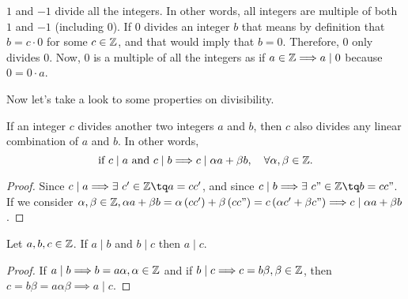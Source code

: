 
\begin{remark}
    $1$ and $-1$ divide all the integers. In other words, all integers are multiple of both $1$ and $-1$
    (including $0$). If $0$ divides an integer $b$ that means by definition that $b = c\cdot 0$ for some
    $c\in\mathbb{Z}$, and that would imply that $b = 0$. Therefore, $0$ only divides $0$. Now, $0$ is a multiple
    of all the integers as if $a\in\mathbb{Z}\Longrightarrow a\mid 0$ because $0 = 0\cdot a$.
\end{remark}

Now let's take a look to some properties on divisibility.

\begin{prop}
    If an integer $c$ divides another two integers $a$ and $b$, then $c$ also divides any linear combination
    of $a$ and $b$. In other words,
    \begin{equation}
        \textrm{if } c\mid a\textrm{ and } c\mid b\Longrightarrow c\mid \alpha a + \beta b,\quad\forall\alpha, \beta
        \in\mathbb{Z}.
    \end{equation}

\end{prop}

\begin{proof}
    Since $c\mid a\implies\exists\ c'\in\Z\tq a = cc'$, and since $c\mid b\implies\exists\ c"\in\Z\tq
    b = cc"$. If we consider $\alpha, \beta\in\mathbb{Z}, \alpha a + \beta b = \alpha\left(cc'\right) + \beta\left(
    cc"\right) = c\left(\alpha c' + \beta c" \right)\Longrightarrow c\mid \alpha a + \beta b$.
\end{proof}

\begin{prop}
    Let $a, b, c\in\mathbb{Z}$. If $a\mid b$ and $b\mid c$ then $a\mid c$.
\end{prop}

\begin{proof}
    If $a\mid b\Longrightarrow b = a\alpha, \alpha\in\mathbb{Z}$ and if $b\mid c\Longrightarrow c = b\beta, \beta\in\mathbb{Z}$, then
    $c = b\beta = a\alpha\beta\implies a\mid c$.
\end{proof}

